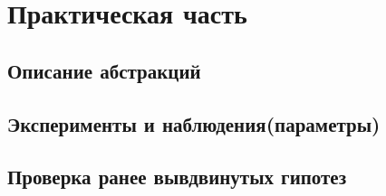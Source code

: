 \newpage
\section{Практическая часть}

\subsection{Описание абстракций}

\subsection{Эксперименты и наблюдения(параметры)}

\subsection{Проверка ранее вывдвинутых гипотез}

